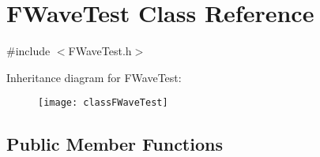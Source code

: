 \hypertarget{classFWaveTest}{}\section{F\+Wave\+Test Class Reference}
\label{classFWaveTest}


{\ttfamily \#include $<$F\+Wave\+Test.\+h$>$}

Inheritance diagram for F\+Wave\+Test\+:\begin{figure}[H]
\begin{center}
\leavevmode
\texttt{[image: classFWaveTest]}
\end{center}
\end{figure}
\subsection*{Public Member Functions}
